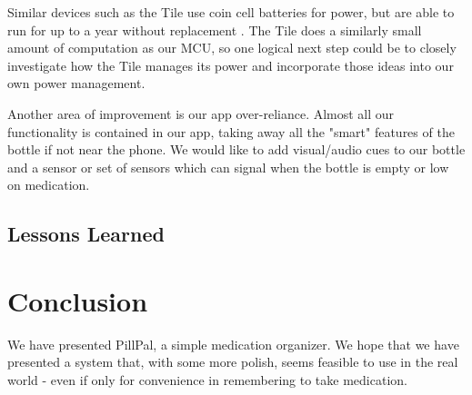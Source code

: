 \documentclass[sigconf]{acmart}
\begin{document}
Similar devices such as the Tile use coin cell batteries for power, but are able to run for up to a year without replacement \cite{tile}. The Tile does a similarly small amount of computation as our MCU, so one logical next step could be to closely investigate how the Tile manages its power and incorporate those ideas into our own power management.

Another area of improvement is our app over-reliance. Almost all our functionality is contained in our app, taking away all the "smart" features of the bottle if not near the phone. We would like to add visual/audio cues to our bottle and a sensor or set of sensors which can signal when the bottle is empty or low on medication.

\subsection{Lessons Learned}


\section{Conclusion}
We have presented PillPal, a simple medication organizer. We hope that we have presented a system that, with some more polish, seems feasible to use in the real world - even if only for convenience in remembering to take medication.



\end{document}
